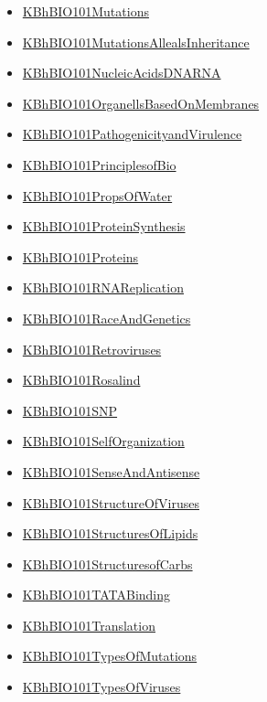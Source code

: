 \documentclass[11pt]{article}
\begin{document}
\begin{itemize}
\begin{itemize}
\item \href{bio101/KBhBIO101Mutations.org}{KBhBIO101Mutations}
\item \href{bio101/KBhBIO101MutationsAllealsInheritance.org}{KBhBIO101MutationsAllealsInheritance}
\item \href{bio101/KBhBIO101NucleicAcidsDNARNA.org}{KBhBIO101NucleicAcidsDNARNA}
\item \href{bio101/KBhBIO101OrganellsBasedOnMembranes.org}{KBhBIO101OrganellsBasedOnMembranes}
\item \href{bio101/KBhBIO101PathogenicityandVirulence.org}{KBhBIO101PathogenicityandVirulence}
\item \href{bio101/KBhBIO101PrinciplesofBio.org}{KBhBIO101PrinciplesofBio}
\item \href{bio101/KBhBIO101PropsOfWater.org}{KBhBIO101PropsOfWater}
\item \href{bio101/KBhBIO101ProteinSynthesis.org}{KBhBIO101ProteinSynthesis}
\item \href{bio101/KBhBIO101Proteins.org}{KBhBIO101Proteins}
\item \href{bio101/KBhBIO101RNAReplication.org}{KBhBIO101RNAReplication}
\item \href{bio101/KBhBIO101RaceAndGenetics.org}{KBhBIO101RaceAndGenetics}
\item \href{bio101/KBhBIO101Retroviruses.org}{KBhBIO101Retroviruses}
\item \href{bio101/KBhBIO101Rosalind.org}{KBhBIO101Rosalind}
\item \href{bio101/KBhBIO101SNP.org}{KBhBIO101SNP}
\item \href{bio101/KBhBIO101SelfOrganization.org}{KBhBIO101SelfOrganization}
\item \href{bio101/KBhBIO101SenseAndAntisense.org}{KBhBIO101SenseAndAntisense}
\item \href{bio101/KBhBIO101StructureOfViruses.org}{KBhBIO101StructureOfViruses}
\item \href{bio101/KBhBIO101StructuresOfLipids.org}{KBhBIO101StructuresOfLipids}
\item \href{bio101/KBhBIO101StructuresofCarbs.org}{KBhBIO101StructuresofCarbs}
\item \href{bio101/KBhBIO101TATABinding.org}{KBhBIO101TATABinding}
\item \href{bio101/KBhBIO101Translation.org}{KBhBIO101Translation}
\item \href{bio101/KBhBIO101TypesOfMutations.org}{KBhBIO101TypesOfMutations}
\item \href{bio101/KBhBIO101TypesOfViruses.org}{KBhBIO101TypesOfViruses}

\end{itemize}
\end{itemize}
\end{document}
